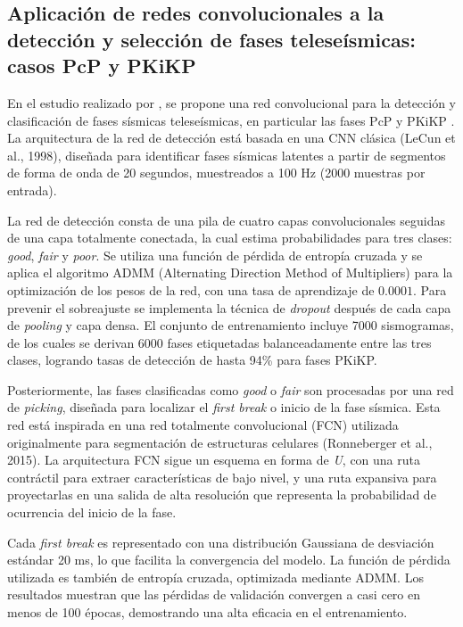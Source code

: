 \subsection{Aplicación de redes convolucionales a la detección y selección de fases teleseísmicas: casos PcP y PKiKP}

En el estudio realizado por \cite{khattak2024conveq}, se propone una red convolucional para la detección y clasificación de fases sísmicas teleseísmicas, en particular las fases PcP y PKiKP \cite{zhu2023teleseismic}. La arquitectura de la red de detección está basada en una CNN clásica (LeCun et al., 1998), diseñada para identificar fases sísmicas latentes a partir de segmentos de forma de onda de 20 segundos, muestreados a 100 Hz (2000 muestras por entrada).

La red de detección consta de una pila de cuatro capas convolucionales seguidas de una capa totalmente conectada, la cual estima probabilidades para tres clases: \textit{good}, \textit{fair} y \textit{poor}. Se utiliza una función de pérdida de entropía cruzada y se aplica el algoritmo ADMM (Alternating Direction Method of Multipliers) para la optimización de los pesos de la red, con una tasa de aprendizaje de $0.0001$. Para prevenir el sobreajuste se implementa la técnica de \textit{dropout} después de cada capa de \textit{pooling} y capa densa. El conjunto de entrenamiento incluye 7000 sismogramas, de los cuales se derivan 6000 fases etiquetadas balanceadamente entre las tres clases, logrando tasas de detección de hasta 94\% para fases PKiKP.

Posteriormente, las fases clasificadas como \textit{good} o \textit{fair} son procesadas por una red de \textit{picking}, diseñada para localizar el \textit{first break} o inicio de la fase sísmica. Esta red está inspirada en una red totalmente convolucional (FCN) utilizada originalmente para segmentación de estructuras celulares (Ronneberger et al., 2015). La arquitectura FCN sigue un esquema en forma de \textit{U}, con una ruta contráctil para extraer características de bajo nivel, y una ruta expansiva para proyectarlas en una salida de alta resolución que representa la probabilidad de ocurrencia del inicio de la fase.

Cada \textit{first break} es representado con una distribución Gaussiana de desviación estándar 20 ms, lo que facilita la convergencia del modelo. La función de pérdida utilizada es también de entropía cruzada, optimizada mediante ADMM. Los resultados muestran que las pérdidas de validación convergen a casi cero en menos de 100 épocas, demostrando una alta eficacia en el entrenamiento.

